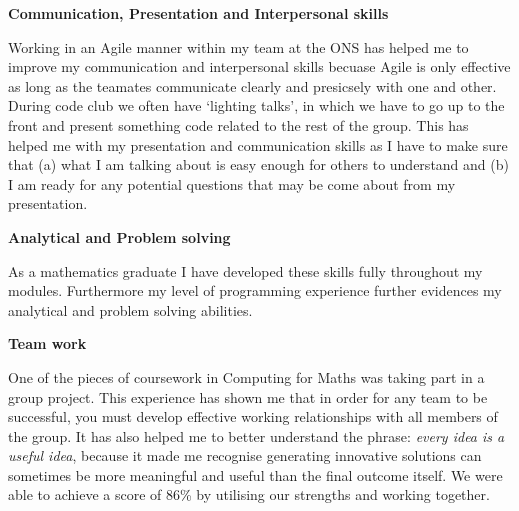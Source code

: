 \documentclass[10pt]{res}
\begin{document}
\begin{resume}
\vspace{-5pt}
\textbf{Communication, Presentation and Interpersonal skills}
\begin{itemize}
    Working in an Agile manner within my team at the ONS has helped me to
    improve my communication and interpersonal skills becuase Agile is only
    effective as long as the teamates communicate clearly and presicsely with
    one and other.
    \\[4pt]
    During code club we often have `lighting talks', in which we have to go
    up to the front and present something code related to the rest of the group.
    This has helped me with my presentation and communication skills as I have
    to make sure that (a) what I am talking about is easy enough for others to
    understand and (b) I am ready for any potential questions that may be come
    about from my presentation.
\end{itemize}

\vspace{-5pt}
\textbf{Analytical and Problem solving}
\begin{itemize}
    As a mathematics graduate I have developed these skills fully throughout my
    modules. Furthermore my level of programming experience further evidences my
    analytical and problem solving abilities.
\end{itemize}

\vspace{-5pt}
\textbf{Team work}
\begin{itemize}
    One of the pieces of coursework in Computing for Maths was taking part in a
    group project. This experience has shown me that in order for any team to be
    successful, you must develop effective working relationships with all
    members of the group. It has also helped me to better understand the
    phrase: \textit{every idea is a useful idea}, because it made me recognise
    generating innovative solutions can sometimes be more meaningful and useful
    than the final outcome itself. We were able to achieve a score of 86\% by
    utilising our strengths and working together.
\end{itemize}


\end{resume}
\end{document}
